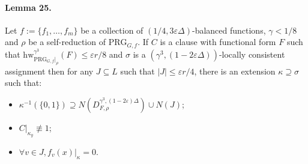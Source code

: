 \documentclass[10pt,a4paper]{article}
\begin{document}
\paragraph{Lemma 25.} Let $f:=\{f_1,\ldots,f_m\}$ be a collection of $(1/4,3\varepsilon\Delta)$-balanced functions, $\gamma<1/8$ and $\rho$ be a self-reduction of $\mathrm{PRG}_{G,f}$. If $C$ is a clause with functional form $F$ such that $\mathrm{hw}_{\mathrm{PRG}_{G,f}|_\rho}^{\gamma^3}(F)\leq\varepsilon r/8$ and $\sigma$ is a $(\gamma^3,(1-2\varepsilon\Delta))$-locally consistent assignment then for any $J\subseteq L$ such that $|J|\leq\varepsilon r/4$, there is an extension $\kappa\supseteq\sigma$ such that:
\begin{itemize}
\item $\kappa^{-1}(\{0,1\})\supseteq N(D_{F,\rho}^{\gamma^3,(1-2\varepsilon)\Delta})\cup N(J)$;
\item $C|_{\kappa_y}\not\equiv1$;
\item $\forall v\in J,f_v(x)|_\kappa=0$.
\end{itemize}
\end{document}
